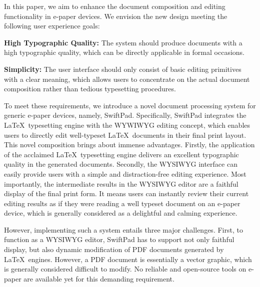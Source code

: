 \documentclass[]{sigchi}
\begin{document}

In this paper, we aim to enhance the document composition and editing functionality in e-paper devices. We envision the new design meeting the following user experience goals: 

\textbf{High Typographic Quality:} The system should produce documents with a high typographic quality, which can be directly applicable in formal occasions. 

\textbf{Simplicity:} The user interface should only consist of basic editing primitives with a clear meaning, which allows users to concentrate on the actual document composition rather than tedious typesetting procedures. 

To meet these requirements, we introduce a novel document processing system for generic e-paper devices, namely, SwiftPad. Specifically, SwiftPad integrates the \LaTeX\ typesetting engine with the WYWIWYG editing concept, which enables users to directly edit well-typeset \LaTeX\ documents in their final print layout.
This novel composition brings about immense advantages.
Firstly, the application of the acclaimed \LaTeX\ typesetting engine delivers an excellent typographic quality in the generated documents. 
Secondly, the WYSIWYG interface can easily provide users with a simple and distraction-free editing experience.
Most importantly, the intermediate results in the WYSIWYG editor are a faithful display of the final print form. It means users can instantly review their current editing results as if they were reading a well typeset document on an e-paper device, which is generally considered as a delightful and calming experience.


However, implementing such a system entails three major challenges.
First, to function as a WYSIWYG editor, SwiftPad has to support not only faithful display, but also dynamic modification of PDF documents generated by \LaTeX\ engines. However, a PDF document is essentially a vector graphic, which is generally considered difficult to modify. No reliable and open-source tools on e-paper are available yet for this demanding requirement.
\end{document}

